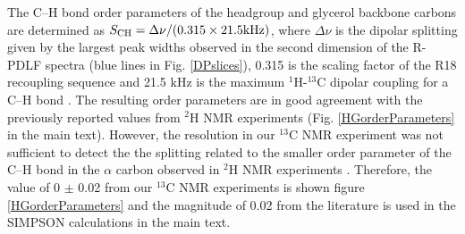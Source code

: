 \documentclass[journal=jpcbfk]{achemso}
\begin{document}
The C--H bond order parameters of the headgroup and glycerol backbone carbons are determined 
as $S_{\rm CH}=\Delta\nu/(0.315\times21.5  {\rm kHz})$, where $\Delta\nu$ is the dipolar splitting
given by the largest peak widths observed in the second dimension of the R-PDLF spectra
(blue lines in Fig. \ref{DPslices}), 0.315 is the scaling factor of the R18 recoupling sequence 
and 21.5 kHz is the maximum $^1$H-$^{13}$C dipolar coupling for a C--H bond \cite{dvinskikh04}.
The resulting order parameters are in good agreement with the previously reported values
from $^2$H NMR experiments \cite{browning80} (Fig. \ref{HGorderParameters} in the main text).
However, the resolution in our $^{13}$C NMR experiment was not sufficient to detect the
the splitting related to the smaller order parameter of the C--H bond in the $\alpha$ carbon
observed in $^2$H NMR experiments \cite{browning80}. Therefore, the value of  0 $\pm$ 0.02 from our
$^{13}$C NMR experiments is shown figure \ref{HGorderParameters} 
and the magnitude of 0.02 from the literature is used in the SIMPSON calculations in the main text.
\end{document}
